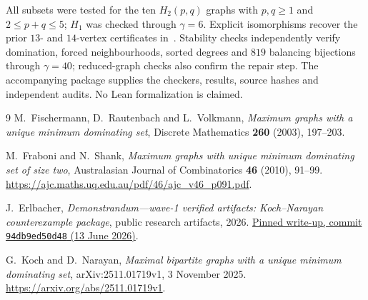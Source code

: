 \documentclass[11pt]{article}
\theoremstyle{definition}
\theoremstyle{remark}
\begin{document}
All subsets were tested for the ten $H_2(p,q)$ graphs with
$p,q\ge1$ and $2\le p+q\le5$; $H_1$ was checked through $\gamma=6$.
Explicit isomorphisms recover the prior $13$- and $14$-vertex certificates
in~\cite{E}. Stability checks independently verify domination, forced
neighbourhoods, sorted degrees and $819$ balancing bijections through
$\gamma=40$; reduced-graph checks also confirm the repair step.
The accompanying package supplies the checkers, results, source hashes
and independent audits. No Lean formalization is claimed.

\begin{thebibliography}{9}
M.~Fischermann, D.~Rautenbach and L.~Volkmann,
\emph{Maximum graphs with a unique minimum dominating set},
Discrete Mathematics \textbf{260} (2003), 197--203.

M.~Fraboni and N.~Shank,
\emph{Maximum graphs with unique minimum dominating set of size two},
Australasian Journal of Combinatorics \textbf{46} (2010), 91--99.
\url{https://ajc.maths.uq.edu.au/pdf/46/ajc_v46_p091.pdf}.

J.~Erlbacher,
\emph{Demonstrandum---wave-1 verified artifacts: Koch--Narayan counterexample package},
public research artifacts, 2026.
\href{https://github.com/demonstrandum-research/artifacts/blob/94db9ed50d48a57aae5ccb72e6a95a2b8f8f39d3/problems/p2-factory/kills/koch-narayan/WRITEUP.md}{Pinned write-up, commit \texttt{94db9ed50d48} (13 June 2026)}.

G.~Koch and D.~Narayan,
\emph{Maximal bipartite graphs with a unique minimum dominating set},
arXiv:2511.01719v1, 3 November 2025.
\url{https://arxiv.org/abs/2511.01719v1}.
\end{thebibliography}
\end{document}
